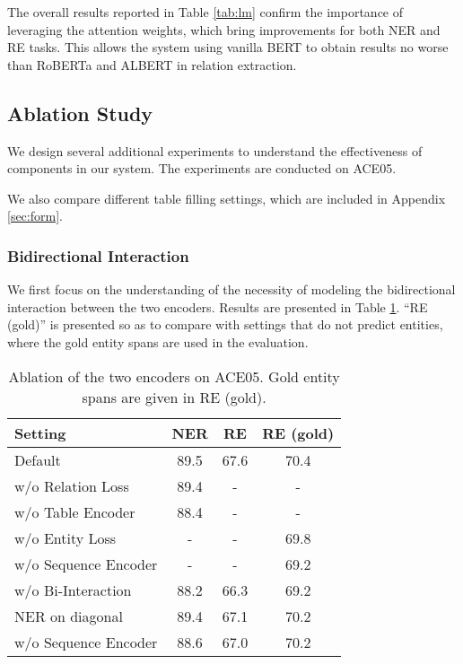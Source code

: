 \documentclass[11pt,a4paper]{article}
\begin{document}
The overall results reported in Table \ref{tab:lm} confirm the importance of leveraging the attention weights, which bring improvements for both NER and RE tasks.
This allows the system using vanilla BERT to obtain results no worse than RoBERTa and ALBERT in relation extraction.


\subsection{Ablation Study}

We design several additional experiments to  understand the effectiveness of components in our system.
The experiments are conducted on ACE05.

We also compare different table filling settings, which are included in Appendix \ref{sec:form}.

\subsubsection{Bidirectional Interaction}

We first focus on the understanding of the necessity of modeling the bidirectional interaction between the two encoders.
Results are presented in Table \ref{tab:joint}.
``RE (gold)'' is presented so as to compare with settings that do not predict entities, where the gold entity spans are used in the evaluation.

\begin{table}[t]
\centering
\scalebox{0.82}
{
\begin{tabular}{lccc}
\toprule
Setting                                      & NER       & RE       &
RE (gold)
\\ \midrule
Default                                      & 89.5      & 67.6     & 70.4 \\
  \quad w/o Relation Loss                    & 89.4      & -        & -     \\
  \quad w/o Table Encoder                    & 88.4      & -        & -     \\
  \quad w/o Entity Loss                      & -         & -        & 69.8 \\
  \quad w/o Sequence Encoder                 & -         & -        & 69.2 \\
  \quad w/o Bi-Interaction                   & 88.2      & 66.3     & 69.2 \\
NER on diagonal                              & 89.4      & 67.1     & 70.2 \\
  \quad w/o Sequence Encoder                 & 88.6      & 67.0     & 70.2 \\
\bottomrule
\end{tabular}
}
\caption{
    Ablation of the two encoders on ACE05.
    Gold entity spans are given in RE (gold).
}
\label{tab:joint}
\end{table}
\end{document}
